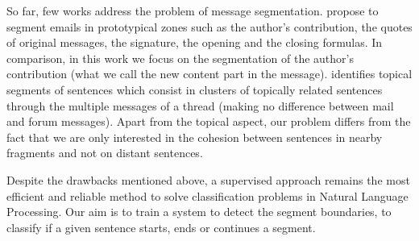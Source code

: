 So far, few works address the problem of message segmentation.
\cite{lampert:2009:emnlp} propose to segment emails in prototypical zones such as the author's contribution, the quotes of original messages, the signature, the opening and the closing formulas. 
In comparison, in this work we focus on the segmentation of the author's contribution (what we call the new content part in the message).
\cite{joty:2013:jair} identifies topical segments of sentences which consist in clusters of topically related sentences through the multiple messages of a thread (making no difference between mail and forum messages). Apart from the topical aspect, our problem differs from the fact that we are only interested in the cohesion between sentences in nearby fragments and %
 not on distant sentences.


Despite the drawbacks mentioned above, a supervised approach remains %
the most efficient and reliable method to solve classification problems in Natural Language Processing. 
% 
Our aim is to train a system to detect the segment boundaries, %
to classify if a given sentence starts, ends or continues a segment.


